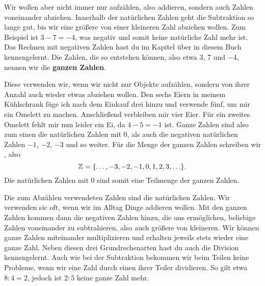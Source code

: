 \documentclass[../../main.tex]{subfiles}
\begin{document}

	Wir wollen aber nicht immer nur aufzählen, also addieren, sondern auch Zahlen voneinander abziehen. Innerhalb der natürlichen Zahlen geht die Subtraktion so lange gut, bis wir eine größere von einer kleineren Zahl abziehen wollen. Zum Beispiel ist $3-7=-4$, was negativ und somit keine natürliche Zahl mehr ist. Das Rechnen mit negativen Zahlen hast du im Kapitel über  in diesem Buch kennengelernt. Die Zahlen, die so entstehen können, also etwa 3, 7 und $-4$, nennen wir die \textbf{ganzen Zahlen}.
	
	Diese verwenden wir, wenn wir nicht nur Objekte aufzählen, sondern von ihrer Anzahl auch wieder etwas abziehen wollen. Den sechs Eiern in meinem Kühlschrank füge ich nach dem Einkauf drei hinzu und verwende fünf, um mir ein Omelett zu machen. Anschließend verbleiben mir vier Eier. Für ein zweites Omelett fehlt mir nun leider ein Ei, da $4-5=-1$ ist. Ganze Zahlen sind also zum einen die natürlichen Zahlen mit $0$, als auch die negativen natürlichen Zahlen $-1$, $-2$, $-3$ und so weiter. Für die Menge der ganzen Zahlen schreiben wir \Integer, also
	$$\mathbb{Z} = \{\ldots, -3, -2, -1, 0, 1, 2, 3, \ldots\}.$$
	Die natürlichen Zahlen mit $0$ sind somit eine Teilmenge der ganzen Zahlen.
	
	Die zum Abzählen verwendeten Zahlen sind die natürlichen Zahlen. Wir verwenden sie oft, wenn wir im Alltag Dinge addieren wollen. Mit den ganzen Zahlen kommen dann die negativen Zahlen hinzu, die uns ermöglichen, beliebige Zahlen voneinander zu subtrahieren, also auch größere von kleineren. Wir können ganze Zahlen miteinander multiplizieren und erhalten jeweils stets wieder eine ganze Zahl. Neben diesen drei Grundrechenarten hast du auch die Division kennengelernt. Auch wie bei der Subtraktion bekommen wir beim Teilen keine Probleme, wenn wir eine Zahl durch einen ihrer Teiler dividieren. So gilt etwa $8 : 4 = 2$, jedoch ist $2 : 5$ keine ganze Zahl mehr.
\end{document}
